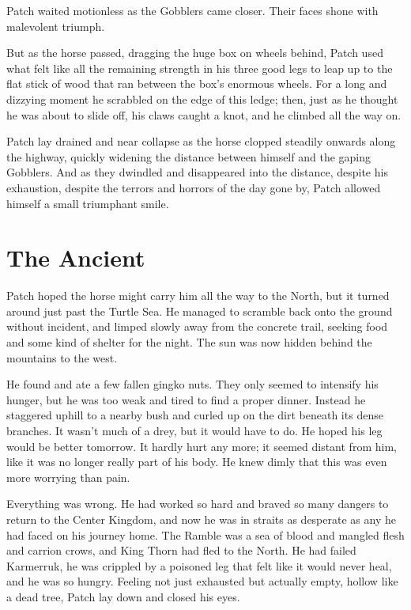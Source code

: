 \documentclass[12pt]{memoir}
\begin{document}
Patch waited motionless as the Gobblers came closer. Their faces shone
with malevolent triumph.

But as the horse passed, dragging the huge box on wheels behind, Patch
used what felt like all the remaining strength in his three good legs
to leap up to the flat stick of wood that ran between the box’s
enormous wheels. For a long and dizzying moment he scrabbled on the
edge of this ledge; then, just as he thought he was about to slide
off, his claws caught a knot, and he climbed all the way on.

Patch lay drained and near collapse as the horse clopped steadily
onwards along the highway, quickly widening the distance between
himself and the gaping Gobblers. And as they dwindled and disappeared
into the distance, despite his exhaustion, despite the terrors and
horrors of the day gone by, Patch allowed himself a small triumphant
smile.


\section{The Ancient}

Patch hoped the horse might carry him all the way to the North, but it
turned around just past the Turtle Sea. He managed to scramble back
onto the ground without incident, and limped slowly away from the
concrete trail, seeking food and some kind of shelter for the
night. The sun was now hidden behind the mountains to the west.

He found and ate a few fallen gingko nuts. They only seemed to
intensify his hunger, but he was too weak and tired to find a proper
dinner. Instead he staggered uphill to a nearby bush and curled up on
the dirt beneath its dense branches. It wasn’t much of a drey, but it
would have to do. He hoped his leg would be better tomorrow. It hardly
hurt any more; it seemed distant from him, like it was no longer
really part of his body. He knew dimly that this was even more
worrying than pain.

Everything was wrong. He had worked so hard and braved so many dangers
to return to the Center Kingdom, and now he was in straits as
desperate as any he had faced on his journey home. The Ramble was a
sea of blood and mangled flesh and carrion crows, and King Thorn had
fled to the North. He had failed Karmerruk, he was crippled by a
poisoned leg that felt like it would never heal, and he was so
hungry. Feeling not just exhausted but actually empty, hollow like a
dead tree, Patch lay down and closed his eyes.
\end{document}
